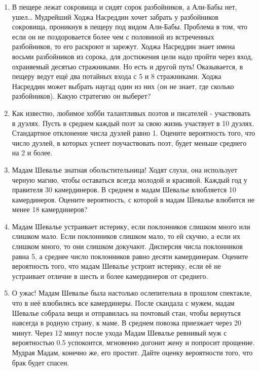 \documentclass[a4paper,12pt]{article}
\begin{document}
\begin{enumerate} %
\item В пещере лежат сокровища и сидят сорок разбойников, а Али-Бабы нет, ушел\ldots
Мудрейший Ходжа Насреддин хочет забрать у разбойников сокровища, проникнув в пещеру под видом Али-Бабы.
Проблема в том, что если он не поздоровается более чем с половиной из встреченных разбойников, то его раскроют и зарежут. Ходжа Насреддин знает имена восьми разбойников из сорока, для достижения цели надо пройти через вход, охраняемый десятью стражниками. Но есть и другой путь!
Оказывается, в пещеру ведут ещё два потайных входа с 5 и 8 стражниками. Ходжа Насреддин может выбрать наугад один из них (он не знает, где сколько разбойников). Какую стратегию он выберет?
\item Как известно, любимое хобби талантливых поэтов и писателей - участвовать в дуэлях. Пусть в среднем каждый поэт за свою жизнь участвует в 10 дуэлях. Стандартное отклонение числа дуэлей равно 1. Оцените вероятность того, что число дуэлей, в которых успеет поучаствовать поэт, будет меньше среднего на 2 и более.
\item Мадам Шевалье знатная обольстительница! Ходят слухи, она использует черную магию, чтобы оставаться всегда молодой и красивой.
Каждый год у правителя 30 камердинеров. В среднем в мадам Шевалье влюбляется 10 камердинеров.
Оцените вероятность, с которой в мадам Шевалье влюбится не менее 18 камердинеров?
\item Мадам Шевалье устраивает истерику, если поклонников слишком много или слишком мало.
Если поклонников слишком мало, то ей скучно, а если их слишком много, то они слишком докучают.
Дисперсия числа поклонников равна 5, а среднее число поклонников равно десяти камердинерам.
Оцените вероятность того, что мадам Шевалье устроит истерику, если её не устраивает отличие в шесть и более камердинеров от среднего.
\item О ужас! Мадам Шевалье была настолько ослепительна в прошлом спектакле, что в неё влюбились все камердинеры.
После скандала с мужем, мадам Шевалье собрала вещи и отправилась на почтовый стан,
чтобы вернуться навсегда в родную страну, к маме. В среднем повозка приезжает через 20 минут.
Через 12 минут после ухода Мадам Шевалье ревнивый муж  с вероятностью 0.5 успокоится,
мгновенно догонит жену и попросит прощение. Мудрая Мадам, конечно же, его простит.
Дайте оценку вероятности того, что брак будет спасен.
\end{enumerate}
 \newpage
\end{document}
